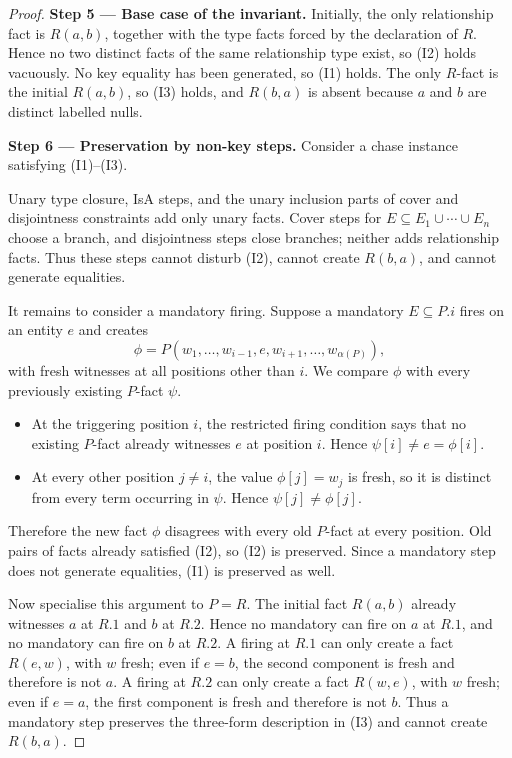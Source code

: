 \documentclass[10pt]{article}
\begin{document}
\begin{proof}
\smallskip\noindent\textbf{Step 5 --- Base case of the invariant.}
Initially, the only relationship fact is \(R(a,b)\), together with
the type facts forced by the declaration of \(R\).  Hence no two
distinct facts of the same relationship type exist, so (I2) holds
vacuously.  No key equality has been generated, so (I1) holds.  The
only \(R\)-fact is the initial \(R(a,b)\), so (I3) holds, and
\(R(b,a)\) is absent because \(a\) and \(b\) are distinct labelled
nulls.

\smallskip\noindent\textbf{Step 6 --- Preservation by non-key steps.}
Consider a chase instance satisfying (I1)--(I3).

Unary type closure, IsA steps, and the unary inclusion parts of cover
and disjointness constraints add only unary facts.  Cover steps for
\(E\subseteq E_1\cup\cdots\cup E_n\) choose a branch, and disjointness
steps close branches; neither adds relationship facts.  Thus these
steps cannot disturb (I2), cannot create \(R(b,a)\), and cannot
generate equalities.

It remains to consider a mandatory firing.  Suppose a mandatory
\(E\subseteq P.i\) fires on an entity \(e\) and creates
\[
\phi=P(w_1,\ldots,w_{i-1},e,w_{i+1},\ldots,w_{\alpha(P)}),
\]
with fresh witnesses at all positions other than \(i\).  We compare
\(\phi\) with every previously existing \(P\)-fact \(\psi\).
\begin{itemize}
\item At the triggering position \(i\), the restricted firing
condition says that no existing \(P\)-fact already witnesses \(e\)
at position \(i\).  Hence \(\psi[i]\neq e=\phi[i]\).
\item At every other position \(j\neq i\), the value \(\phi[j]=w_j\)
is fresh, so it is distinct from every term occurring in \(\psi\).
Hence \(\psi[j]\neq\phi[j]\).
\end{itemize}
Therefore the new fact \(\phi\) disagrees with every old \(P\)-fact
at every position.  Old pairs of facts already satisfied (I2), so
(I2) is preserved.  Since a mandatory step does not generate
equalities, (I1) is preserved as well.

Now specialise this argument to \(P=R\).  The initial fact \(R(a,b)\)
already witnesses \(a\) at \(R.1\) and \(b\) at \(R.2\).  Hence no
mandatory can fire on \(a\) at \(R.1\), and no mandatory can fire on
\(b\) at \(R.2\).  A firing at \(R.1\) can only create a fact
\(R(e,w)\), with \(w\) fresh; even if \(e=b\), the second component
is fresh and therefore is not \(a\).  A firing at \(R.2\) can only
create a fact \(R(w,e)\), with \(w\) fresh; even if \(e=a\), the
first component is fresh and therefore is not \(b\).  Thus a
mandatory step preserves the three-form description in (I3) and
cannot create \(R(b,a)\).


\end{proof}
\end{document}

